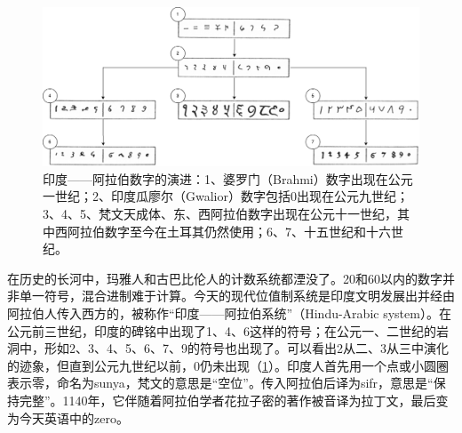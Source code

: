 \documentclass[b5paper]{ctexart}
\begin{document}
\begin{figure}[htbp]
 \centering
 \includegraphics[scale=0.3]{img/Hindu-arabic-num}
 \caption{印度——阿拉伯数字的演进：1、婆罗门（Brahmi）数字出现在公元一世纪；2、印度瓜廖尔（Gwalior）数字包括0出现在公元九世纪；3、4、5、梵文天成体、东、西阿拉伯数字出现在公元十一世纪，其中西阿拉伯数字至今在土耳其仍然使用；6、7、十五世纪和十六世纪。}
 \label{fig:hindu-arabic-numerals}
\end{figure}

在历史的长河中，玛雅人和古巴比伦人的计数系统都湮没了。20和60以内的数字并非单一符号，混合进制难于计算。今天的现代位值制系统是印度文明发展出并经由阿拉伯人传入西方的，被称作“印度——阿拉伯系统”（Hindu-Arabic system）。在公元前三世纪，印度的碑铭中出现了1、4、6这样的符号；在公元一、二世纪的岩洞中，形如2、3、4、5、6、7、9的符号也出现了。可以看出2从二、3从三中演化的迹象，但直到公元九世纪以前，0仍未出现（\cref{fig:hindu-arabic-numerals}）。印度人首先用一个点或小圆圈表示零，命名为sunya，梵文的意思是“空位”。传入阿拉伯后译为sifr，意思是“保持完整”。1140年，它伴随着阿拉伯学者花拉子密的著作被音译为拉丁文，最后变为今天英语中的zero。
\end{document}
